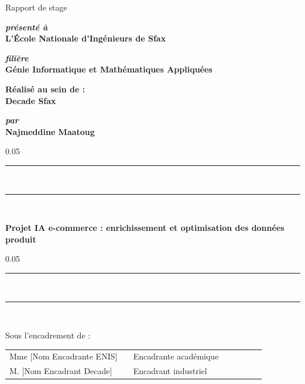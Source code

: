 \begin{titlepage}
\begin{center}
\vspace{10pt}
{%
  \renewcommand*{\familydefault}{\defaultFont}
  \fontsize{34pt}{34pt}\selectfont%
  Rapport de stage
}

\vspace{30pt}
\textbf{\textit{présenté à}}\\

\vspace{10pt}
{%
  \renewcommand*{\familydefault}{\defaultFont}
  \fontsize{16pt}{16pt}\selectfont%
  \textbf{L'École Nationale d'Ingénieurs de Sfax}
}

\vspace{20pt}
\textbf{\textit{filière}}\\

\vspace{10pt}
{%
\renewcommand*{\familydefault}{\defaultFont}
\fontsize{14pt}{14pt}\selectfont%
\textbf{Génie Informatique et Mathématiques Appliquées}
}

\vspace{20pt}
{%
\renewcommand*{\familydefault}{\defaultFont}
\fontsize{14pt}{14pt}\selectfont%
\textbf{Réalisé au sein de :}\\
\vspace{8pt}
\textbf{Decade Sfax}
}

\vspace{28pt}
\textbf{\textit{par}}\\
\vspace{8pt}
{%
  \fontsize{18pt}{18pt}\selectfont%
  \textbf{Najmeddine Maatoug}
}

\vspace{20pt}
{%
  \begin{spacing}{0.05}
    \rule{420pt}{2pt}\\
    \rule{420pt}{0.75pt}\\
  \end{spacing}
  \renewcommand*{\familydefault}{\defaultFont}
  \fontsize{18pt}{18pt}\selectfont%
  \vspace{12pt}
  \textbf{Projet IA e-commerce : enrichissement et optimisation des données produit}
  \vspace{10pt}
  \begin{spacing}{0.05}
    \rule{420pt}{0.75pt}\\
    \rule{420pt}{2pt}\\
  \end{spacing}
}

\vspace{30pt}
Sous l'encadrement de :\\
\vspace{16pt}
\begin{tabular}{p{0.42\linewidth}p{0.45\linewidth}}
  Mme [Nom Encadrante ENIS] & Encadrante académique \\
  M. [Nom Encadrant Decade] & Encadrant industriel \\
\end{tabular}

\vfill

\end{center}
\end{titlepage}
